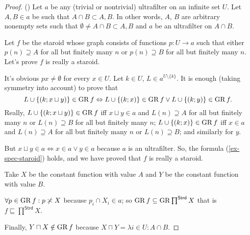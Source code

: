 \begin{proof}
() Let $a$ be any (trivial or nontrivial) ultrafilter
on an infinite set $U$. Let $A,B\in a$ be such that $A\cap B\subset A,B$.
In other words, $A$, $B$ are arbitrary nonempty sets such that $\emptyset\neq A\cap B\subset A,B$
and $a$ be an ultrafilter on $A\cap B$.

Let $f$ be the staroid whose graph consists of functions $p:U\rightarrow a$
such that either $p(n)\supseteq A$ for all but finitely many $n$
or $p(n)\supseteq B$ for all but finitely many $n$. Let's prove
$f$ is really a staroid.

It's obvious $px\neq\emptyset$ for every $x\in U$. Let $k\in U$,
$L\in a^{U\setminus\{k\}}$. It is enough (taking symmetry into account)
to prove that 
\begin{equation}
L\cup\{(k;x\sqcup y)\}\in\operatorname{GR} f\Leftrightarrow L\cup\{(k;x)\}\in\operatorname{GR} f\vee L\cup\{(k;y)\}\in\operatorname{GR} f.\label{ex-spec-staroid}
\end{equation}
Really, $L\cup\{(k;x\sqcup y)\}\in\operatorname{GR} f$ iff $x\sqcup y\in a$ and
$L(n)\supseteq A$ for all but finitely many $n$ or $L(n)\supseteq B$
for all but finitely many $n$; $L\cup\{(k;x)\}\in\operatorname{GR} f$ iff $x\in a$
and $L(n)\supseteq A$ for all but finitely many $n$ or $L(n)\supseteq B$;
and similarly for $y$.

But $x\sqcup y\in a\Leftrightarrow x\in a\vee y\in a$ because $a$
is an ultrafilter. So, the formula (\ref{ex-spec-staroid}) holds,
and we have proved that $f$ is really a staroid.

Take $X$ be the constant function with value $A$ and $Y$ be the
constant function with value $B$.

$\forall p\in\operatorname{GR} f:p\not\asymp X$ because $p_{i}\cap X_{i}\in a$; so
$\operatorname{GR} f\subseteq\operatorname{GR}\prod^{\mathsf{Strd}}X$ that is $f\sqsubseteq\prod^{\mathsf{Strd}}X$.

Finally, $Y\sqcap X\notin\operatorname{GR} f$ because $X\sqcap Y=\lambda i\in U:A\cap B$.
\end{proof}

